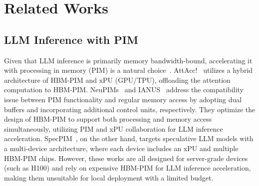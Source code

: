 \section{Related Works}\label{sec:related-works}

\subsection{LLM Inference with PIM}\label{sec:related-works-PIM}



Given that LLM inference is primarily memory bandwidth-bound, accelerating it with processing in memory (PIM) is a natural choice~\cite{li2020hitm,zhai2023star,zhu2023processing}. AttAcc!~\cite{park2024attacc} utilizes a hybrid architecture of HBM-PIM and xPU (GPU/TPU), offloading the attention computation to HBM-PIM. NeuPIMs~\cite{heo2024neupims} and IANUS~\cite{seo2024ianus} address the compatibility issue between PIM functionality and regular memory access by adopting dual buffers and incorporating additional control units, respectively. They optimize the design of HBM-PIM to support both processing and memory access simultaneously, utilizing PIM and xPU collaboration for LLM inference acceleration. SpecPIM~\cite{li2024specpim}, on the other hand, targets speculative LLM models with a multi-device architecture, where each device includes an xPU and multiple HBM-PIM chips. However, these works are all designed for server-grade devices (such as H100) and rely on expensive HBM-PIM for LLM inference acceleration, making them unsuitable for local deployment with a limited budget. 

